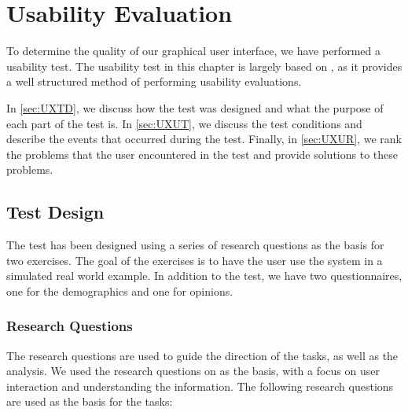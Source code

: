 \chapter{Usability Evaluation}\label{cha:usability}

To determine the quality of our graphical user interface, we have performed a
usability test. The usability test in this chapter is largely based
on \citep[p. 65-72 \& 269-275]{UXBook}, as it provides a well structured method
of performing usability evaluations.\nl

In \autoref{sec:UXTD}, we discuss how the test was designed and what the
purpose of each part of the test is. In \autoref{sec:UXUT}, we discuss the test
conditions and describe the events that occurred during the test.
Finally, in \autoref{sec:UXUR}, we rank the problems that the user encountered
in the test and provide solutions to these problems.

\section{Test Design}\label{sec:UXTD}
The test has been designed using a series of research questions as the basis
for two exercises. The goal of the exercises is to have the user use the
system in a simulated real world example. In addition to the test, we have two
questionnaires, one for the demographics and one for opinions.

\subsection{Research Questions}\label{subsec:UXRQ}
The research questions are used to guide the direction of the tasks, as well as
the analysis. We used the research questions on \citep[p. 70-71]{UXBook} as the
basis, with a focus on user interaction and understanding the information.
The following research questions are used as the basis for the tasks:

